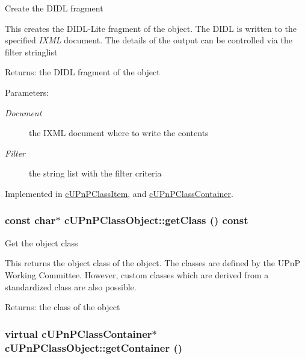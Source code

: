 Create the DIDL fragment

This creates the DIDL-Lite fragment of the object. The DIDL is written to the specified {\em IXML\/} document. The details of the output can be controlled via the filter stringlist

\begin{Desc}
\item[Returns:]the DIDL fragment of the object \end{Desc}
\begin{Desc}
\item[Parameters:]
\begin{description}
\item[{\em Document}]the IXML document where to write the contents \item[{\em Filter}]the string list with the filter criteria \end{description}
\end{Desc}


Implemented in \hyperlink{classcUPnPClassItem_5385975d79cd8e8b78429ecfe11b30a7}{cUPnPClassItem}, and \hyperlink{classcUPnPClassContainer_fec5b0bae4ed2d194bfc9973f14a3926}{cUPnPClassContainer}.\hypertarget{classcUPnPClassObject_39c9bb75681ce4517c4eff6a6bdffad7}{
\subsubsection[{getClass}]{\setlength{\rightskip}{0pt plus 5cm}const char$\ast$ cUPnPClassObject::getClass () const}}
\label{classcUPnPClassObject_39c9bb75681ce4517c4eff6a6bdffad7}


Get the object class

This returns the object class of the object. The classes are defined by the UPnP Working Committee. However, custom classes which are derived from a standardized class are also possible.

\begin{Desc}
\item[Returns:]the class of the object \end{Desc}
\hypertarget{classcUPnPClassObject_ce6f39a8484ae48ea9801b11046cd2a6}{
\subsubsection[{getContainer}]{\setlength{\rightskip}{0pt plus 5cm}virtual {\bf cUPnPClassContainer}$\ast$ cUPnPClassObject::getContainer ()}}
\label{classcUPnPClassObject_ce6f39a8484ae48ea9801b11046cd2a6}


